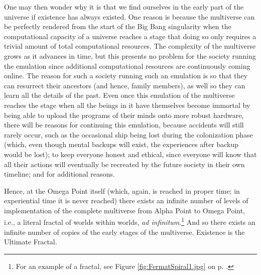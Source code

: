 \documentclass[letterpaper,12pt]{article}
\begin{document}
One may then wonder why it is that we find ourselves in the early part of the universe if existence has always existed. One reason is because the multiverse can be perfectly rendered from the start of the Big Bang singularity when the computational capacity of a universe reaches a stage that doing so only requires a trivial amount of total computational resources. The complexity of the multiverse grows as it advances in time, but this presents no problem for the society running the emulation since additional computational resources are continuously coming online. The reason for such a society running such an emulation is so that they can resurrect their ancestors (and hence, family members), as well so they can learn all the details of the past. Even once this emulation of the multiverse reaches the stage when all the beings in it have themselves become immortal by being able to upload the programs of their minds onto more robust hardware, there will be reasons for continuing this emulation, because accidents will still rarely occur, such as the occasional ship being lost during the colonization phase (which, even though mental backups will exist, the experiences after backup would be lost); to keep everyone honest and ethical, since everyone will know that all their actions will eventually be recreated by the future society in their own timeline; and for additional reasons.

Hence, at the Omega Point itself (which, again, is reached in proper time; in experiential time it is never reached) there exists an infinite number of levels of implementation of the complete multiverse from Alpha Point to Omega Point, i.e., a literal fractal of worlds within worlds, \emph{ad infinitum}.\footnote{For an example of a fractal, see Figure \ref{fig:FermatSpiral1.jpg} on p. \pageref{fig:FermatSpiral1.jpg}.} And so there exists an infinite number of copies of the early stages of the multiverse. Existence is the Ultimate Fractal.
\end{document}
